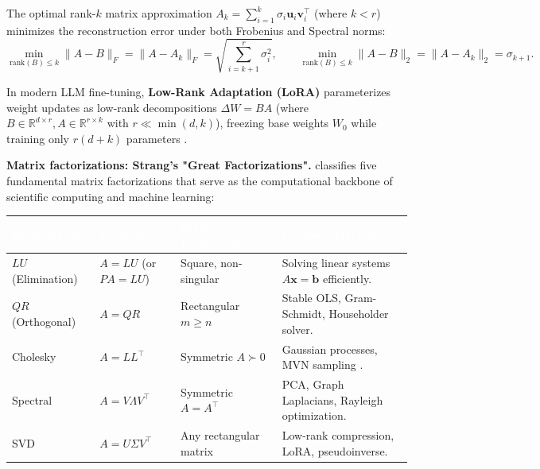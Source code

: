 \documentclass[11pt,a4paper]{article}
\begin{document}
	\begin{keyconcept}
		The optimal rank-$k$ matrix approximation $A_k = \sum_{i=1}^k \sigma_i \mathbf{u}_i \mathbf{v}_i^\top$ (where $k < r$) minimizes the reconstruction error under both Frobenius and Spectral norms:
		\begin{equation}
			\min_{\mathrm{rank}(B) \le k} \|A - B\|_F = \|A - A_k\|_F = \sqrt{\sum_{i=k+1}^r \sigma_i^2}, \qquad
			\min_{\mathrm{rank}(B) \le k} \|A - B\|_2 = \|A - A_k\|_2 = \sigma_{k+1}.
		\end{equation}
	\end{keyconcept}
	In modern LLM fine-tuning, \textbf{Low-Rank Adaptation (LoRA)} parameterizes weight updates as low-rank decompositions $\Delta W = B A$ (where $B \in \mathbb{R}^{d \times r}, A \in \mathbb{R}^{r \times k}$ with $r \ll \min(d, k)$), freezing base weights $W_0$ while training only $r(d+k)$ parameters \parencite{hu2021}.

	\textbf{Matrix factorizations: Strang's "Great Factorizations".}
	\textcite[Chapter~7]{strang2019} classifies five fundamental matrix factorizations that serve as the computational backbone of scientific computing and machine learning:

	\begin{keyconcept}
		\begin{center}
			\small\sffamily
			\renewcommand{\arraystretch}{1.25}
			\begin{tabular}{@{}L{2.8cm} L{3.8cm} L{3.0cm} L{4.2cm}@{}}
				\toprule
				\textcolor{white}{\textbf{Factorization}} &
				\textcolor{white}{\textbf{Formula}} &
				\textcolor{white}{\textbf{Matrix Requirements}} &
				\textcolor{white}{\textbf{Primary ML Role}} \\
				\midrule
				$LU$ (Elimination) & $A = LU$ (or $PA=LU$) & Square, non-singular & Solving linear systems $A\mathbf{x}=\mathbf{b}$ efficiently. \\
				$QR$ (Orthogonal) & $A = QR$ & Rectangular $m \ge n$ & Stable OLS, Gram-Schmidt, Householder solver. \\
				Cholesky & $A = L L^{\!\top}$ & Symmetric $A \succ 0$ & Gaussian processes, MVN sampling \parencite{golub2013}. \\
				Spectral & $A = V \Lambda V^{\!\top}$ & Symmetric $A = A^{\!\top}$ & PCA, Graph Laplacians, Rayleigh optimization. \\
				SVD & $A = U \Sigma V^{\!\top}$ & Any rectangular matrix & Low-rank compression, LoRA, pseudoinverse. \\
				\bottomrule
			\end{tabular}
		\end{center}
	\end{keyconcept}
\end{document}
